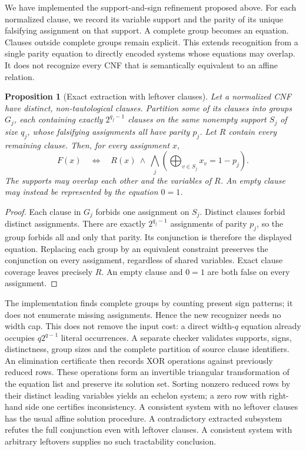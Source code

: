 \documentclass[11pt,a4paper]{article}
\numberwithin{equation}{section}
\theoremstyle{plain}
\newtheorem{proposition}[lemma]{Proposition}
\theoremstyle{definition}
\theoremstyle{remark}
\begin{document}
We have implemented the support-and-sign refinement proposed above. For each normalized clause, we record its variable support and the parity of its unique falsifying assignment on that support. A complete group becomes an equation. Clauses outside complete groups remain explicit. This extends recognition from a single parity equation to directly encoded systems whose equations may overlap. It does not recognize every CNF that is semantically equivalent to an affine relation.

\begin{proposition}[Exact extraction with leftover clauses]
\label{prop:direct-affine-extraction}
Let a normalized CNF have distinct, non-tautological clauses. Partition some of its clauses into groups $G_j$, each containing exactly $2^{q_j-1}$ clauses on the same nonempty support $S_j$ of size $q_j$, whose falsifying assignments all have parity $p_j$. Let $R$ contain every remaining clause. Then, for every assignment $x$,
\[
 F(x)\quad\Longleftrightarrow\quad
 R(x)\ \land\ \bigwedge_j\left(\bigoplus_{v\in S_j}x_v=1-p_j\right).
\]
The supports may overlap each other and the variables of $R$. An empty clause may instead be represented by the equation $0=1$.
\end{proposition}

\begin{proof}
Each clause in $G_j$ forbids one assignment on $S_j$. Distinct clauses forbid distinct assignments. There are exactly $2^{q_j-1}$ assignments of parity $p_j$, so the group forbids all and only that parity. Its conjunction is therefore the displayed equation. Replacing each group by an equivalent constraint preserves the conjunction on every assignment, regardless of shared variables. Exact clause coverage leaves precisely $R$. An empty clause and $0=1$ are both false on every assignment.
\end{proof}

The implementation finds complete groups by counting present sign patterns; it does not enumerate missing assignments. Hence the new recognizer needs no width cap. This does not remove the input cost: a direct width-$q$ equation already occupies $q2^{q-1}$ literal occurrences. A separate checker validates supports, signs, distinctness, group sizes and the complete partition of source clause identifiers. An elimination certificate then records XOR operations against previously reduced rows. These operations form an invertible triangular transformation of the equation list and preserve its solution set. Sorting nonzero reduced rows by their distinct leading variables yields an echelon system; a zero row with right-hand side one certifies inconsistency. A consistent system with no leftover clauses has the usual affine solution procedure. A contradictory extracted subsystem refutes the full conjunction even with leftover clauses. A consistent system with arbitrary leftovers supplies no such tractability conclusion.
\end{document}
